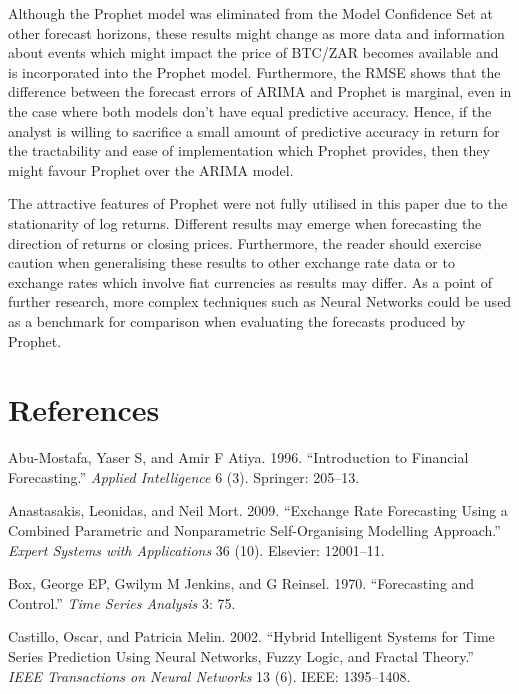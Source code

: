 \documentclass[12pt,a4paper]{article}
\numberwithin{equation}{section}
\numberwithin{figure}{section}
\numberwithin{table}{section}
\begin{document}
Although the Prophet model was eliminated from the Model Confidence Set
at other forecast horizons, these results might change as more data and
information about events which might impact the price of BTC/ZAR becomes
available and is incorporated into the Prophet model. Furthermore, the
RMSE shows that the difference between the forecast errors of ARIMA and
Prophet is marginal, even in the case where both models don't have equal
predictive accuracy. Hence, if the analyst is willing to sacrifice a
small amount of predictive accuracy in return for the tractability and
ease of implementation which Prophet provides, then they might favour
Prophet over the ARIMA model.

The attractive features of Prophet were not fully utilised in this paper
due to the stationarity of log returns. Different results may emerge
when forecasting the direction of returns or closing prices.
Furthermore, the reader should exercise caution when generalising these
results to other exchange rate data or to exchange rates which involve
fiat currencies as results may differ. As a point of further research,
more complex techniques such as Neural Networks could be used as a
benchmark for comparison when evaluating the forecasts produced by
Prophet.

\newpage

\section*{References}\label{references}

\hypertarget{refs}{}
\hypertarget{ref-abu1996}{}
Abu-Mostafa, Yaser S, and Amir F Atiya. 1996. ``Introduction to
Financial Forecasting.'' \emph{Applied Intelligence} 6 (3). Springer:
205--13.

\hypertarget{ref-anastasakis2009}{}
Anastasakis, Leonidas, and Neil Mort. 2009. ``Exchange Rate Forecasting
Using a Combined Parametric and Nonparametric Self-Organising Modelling
Approach.'' \emph{Expert Systems with Applications} 36 (10). Elsevier:
12001--11.

\hypertarget{ref-box1970}{}
Box, George EP, Gwilym M Jenkins, and G Reinsel. 1970. ``Forecasting and
Control.'' \emph{Time Series Analysis} 3: 75.

\hypertarget{ref-castillo2002}{}
Castillo, Oscar, and Patricia Melin. 2002. ``Hybrid Intelligent Systems
for Time Series Prediction Using Neural Networks, Fuzzy Logic, and
Fractal Theory.'' \emph{IEEE Transactions on Neural Networks} 13 (6).
IEEE: 1395--1408.
\end{document}
